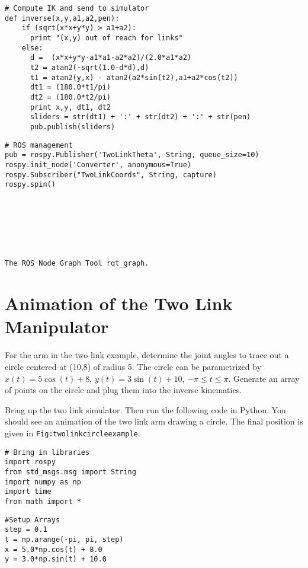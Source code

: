 \begin{verbatim}
# Compute IK and send to simulator
def inverse(x,y,a1,a2,pen):
    if (sqrt(x*x+y*y) > a1+a2):
      print "(x,y) out of reach for links"
    else:
      d =  (x*x+y*y-a1*a1-a2*a2)/(2.0*a1*a2)
      t2 = atan2(-sqrt(1.0-d*d),d)
      t1 = atan2(y,x) - atan2(a2*sin(t2),a1+a2*cos(t2))
      dt1 = (180.0*t1/pi)
      dt2 = (180.0*t2/pi)
      print x,y, dt1, dt2
      sliders = str(dt1) + ':' + str(dt2) + ':' + str(pen)
      pub.publish(sliders)
\end{verbatim}

\begin{verbatim}
# ROS management
pub = rospy.Publisher('TwoLinkTheta', String, queue_size=10)
rospy.init_node('Converter', anonymous=True)
rospy.Subscriber("TwoLinkCoords", String, capture)
rospy.spin()







The ROS Node Graph Tool rqt_graph.
\end{verbatim}

\hypertarget{animation-of-the-two-link-manipulator}{%
\section{Animation of the Two Link
Manipulator}\label{animation-of-the-two-link-manipulator}}

For the arm in the two link example, determine the joint angles to trace
out a circle centered at (10,8) of radius 5. The circle can be
parametrized by \(x(t) = 5\cos (t) + 8\), \(y(t) = 3 \sin(t) + 10\),
\(-\pi \leq t \leq \pi\). Generate an array of points on the circle and
plug them into the inverse kinematics.

Bring up the two link simulator. Then run the following code in Python.
You should see an animation of the two link arm drawing a circle. The
final position is given in \texttt{Fig:twolinkcircleexample}.

\begin{verbatim}
# Bring in libraries
import rospy
from std_msgs.msg import String
import numpy as np
import time
from math import *
\end{verbatim}

\begin{verbatim}
#Setup Arrays
step = 0.1
t = np.arange(-pi, pi, step)
x = 5.0*np.cos(t) + 8.0
y = 3.0*np.sin(t) + 10.0
\end{verbatim}

